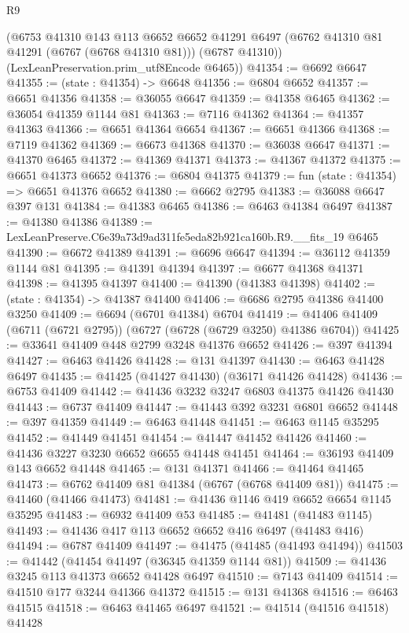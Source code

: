 \begin{lexlean}{R9}
\begin{coremodule}
      (@6753
        @41310
        @143
        @113
        @6652
        @6652
        @41291
        @6497
        (@6762 @41310 @81 @41291 (@6767 (@6768 @41310 @81)))
        (@6787 @41310))
      (LexLeanPreservation.prim_utf8Encode @6465))
@41354 := @6692 @6647
@41355 := (state : @41354) -> @6648
@41356 := @6804 @6652
@41357 := @6651 @41356
@41358 := @36055 @6647
@41359 := @41358 @6465
@41362 := @36054 @41359 @1144 @81
@41363 := @7116 @41362
@41364 := @41357 @41363
@41366 := @6651 @41364 @6654
@41367 := @6651 @41366
@41368 := @7119 @41362
@41369 := @6673 @41368
@41370 := @36038 @6647
@41371 := @41370 @6465
@41372 := @41369 @41371
@41373 := @41367 @41372
@41375 := @6651 @41373 @6652
@41376 := @6804 @41375
@41379 := fun (state : @41354) => @6651 @41376 @6652
@41380 := @6662 @2795
@41383 := @36088 @6647 @397 @131
@41384 := @41383 @6465
@41386 := @6463 @41384 @6497
@41387 := @41380 @41386
@41389 := LexLeanPreserve.C6e39a73d9ad311fe5eda82b921ca160b.R9.__fits_19 @6465
@41390 := @6672 @41389
@41391 := @6696 @6647
@41394 := @36112 @41359 @1144 @81
@41395 := @41391 @41394
@41397 := @6677 @41368 @41371
@41398 := @41395 @41397
@41400 := @41390 (@41383 @41398)
@41402 := (state : @41354) -> @41387 @41400
@41406 := @6686 @2795 @41386 @41400 @3250
@41409 := @6694 (@6701 @41384) @6704
@41419 := @41406 @41409 (@6711 (@6721 @2795)) (@6727 (@6728 (@6729 @3250) @41386 @6704))
@41425 := @33641 @41409 @448 @2799 @3248 @41376 @6652
@41426 := @397 @41394
@41427 := @6463 @41426
@41428 := @131 @41397
@41430 := @6463 @41428 @6497
@41435 := @41425 (@41427 @41430) (@36171 @41426 @41428)
@41436 := @6753 @41409
@41442 := @41436 @3232 @3247 @6803 @41375 @41426 @41430
@41443 := @6737 @41409
@41447 := @41443 @392 @3231 @6801 @6652
@41448 := @397 @41359
@41449 := @6463 @41448
@41451 := @6463 @1145 @35295
@41452 := @41449 @41451
@41454 := @41447 @41452 @41426
@41460 := @41436 @3227 @3230 @6652 @6655 @41448 @41451
@41464 := @36193 @41409 @143 @6652 @41448
@41465 := @131 @41371
@41466 := @41464 @41465
@41473 := @6762 @41409 @81 @41384 (@6767 (@6768 @41409 @81))
@41475 := @41460 (@41466 @41473)
@41481 := @41436 @1146 @419 @6652 @6654 @1145 @35295
@41483 := @6932 @41409 @53
@41485 := @41481 (@41483 @1145)
@41493 := @41436 @417 @113 @6652 @6652 @416 @6497 (@41483 @416)
@41494 := @6787 @41409
@41497 := @41475 (@41485 (@41493 @41494))
@41503 := @41442 (@41454 @41497 (@36345 @41359 @1144 @81))
@41509 := @41436 @3245 @113 @41373 @6652 @41428 @6497
@41510 := @7143 @41409
@41514 := @41510 @177 @3244 @41366 @41372
@41515 := @131 @41368
@41516 := @6463 @41515
@41518 := @6463 @41465 @6497
@41521 := @41514 (@41516 @41518) @41428

\end{coremodule}
\end{lexlean}
